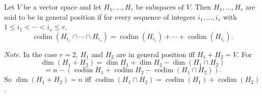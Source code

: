Let $V$ be a vector space and let $H_1, \ldots, H_r$ be subspaces of $V$. Then $H_1, \ldots, H_r$ are said to be in general position if for every sequence of integers $i_1, \ldots, i_s$ with $1 \leq i_1 < \cdots < i_s \leq r$,
$$
\operatorname{codim} (H_{i_1} \cap \cdots \cap H_{i_s}) = \operatorname{codim} (H_{i_1}) + \cdots + \operatorname{codim} (H_{i_s}).
$$

\textit{Note.} In the case $r = 2$, $H_1$ and $H_2$ are in general position iff $H_1 + H_2 = V$. For
$$
\dim (H_1 + H_2) = \dim H_1 + \dim H_2 - \dim (H_1 \cap H_2)
$$
$$
= n - (\operatorname{codim} H_1 + \operatorname{codim} H_2 - \operatorname{codim} (H_1 \cap H_2)).
$$
So $\dim (H_1 + H_2) = n$ iff $\operatorname{codim} (H_1 \cap H_2) = \operatorname{codim} (H_1) + \operatorname{codim} (H_2)$.
